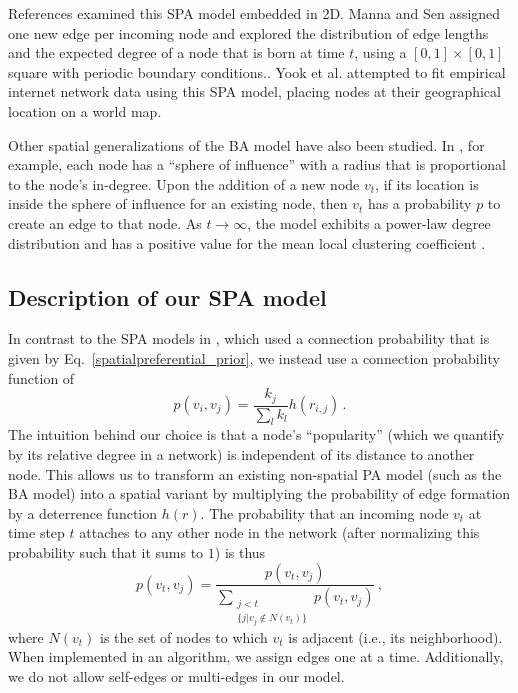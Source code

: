 \documentclass[%
 reprint,
 amsmath,amssymb,
 aps,
]{revtex4-1}
\begin{document}
References \cite{SPA2, SPA3} examined this SPA model embedded in 2D. Manna and Sen \cite{SPA2} assigned one new edge per incoming node and explored the distribution of edge lengths and the expected degree of a node that is born at time $t${\color{red}, using a $[0, 1] \times [0, 1]$ square with periodic boundary conditions.}. Yook et al. \cite{SPA3} attempted to fit empirical internet network data using this SPA model{\color{red}, placing nodes at their geographical location on a world map}.

Other spatial generalizations of the BA model have also been studied. In \cite{aiello, emmanuel}, for example, each node has a ``sphere of influence'' with a radius that is proportional to the node's in-degree. Upon the addition of a new node $v_t$, if its location is inside the sphere of influence for an existing node, then $v_t$ has a probability $p$ to create an edge to that node. As $t \rightarrow \infty$, the model exhibits a power-law degree distribution and has a positive value for the mean local clustering coefficient \cite{emmanuel}. 



\subsection{Description of our SPA model}

In contrast to the SPA models in \cite{SPA1,SPA2,SPA3}, which used a connection probability that is given by Eq.~\eqref{spatialpreferential_prior}, we instead use a connection probability function of
\begin{equation} \label{spatialpreferential}
    p(v_i,v_j) = \frac{k_j}{\sum_l k_l}h(r_{i,j})\,.
\end{equation}
The intuition behind our choice is that a node's ``popularity'' (which we quantify by its relative degree in a network) is independent of its distance to another node. This allows us to transform an existing non-spatial PA model (such as the BA model) into a spatial variant by multiplying the probability of edge formation by a deterrence function $h(r)$. The probability that an incoming node $v_t$ at time step $t$ attaches to
any other node in the network (after normalizing this probability such that it sums to $1$) is thus
\begin{equation} \label{spatialpreferential_normalized}
	p(v_t, v_j) = \frac{p(v_t, v_j)}{\sum\limits_{\substack{j < t \\ \{j  |  v_j \not\in N(v_t)\}}} p(v_t, v_j)}\,,
\end{equation}
where $N(v_t)$ is the set of nodes to which $v_t$ is adjacent (i.e., its neighborhood). When implemented in an algorithm, we assign edges one at a time. Additionally, we do not allow self-edges or multi-edges in our model. 
\end{document}
